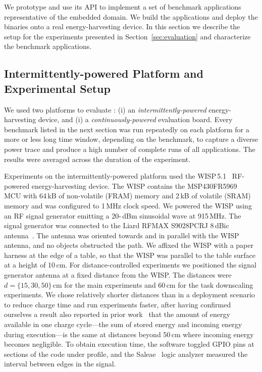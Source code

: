 We prototype \sys and use its API to implement a set of benchmark
applications representative of the embedded domain. We build the applications
and deploy the binaries onto a real energy-harvesting device. In this section
we describe the setup for the experiments presented in
Section~\ref{sec:evaluation} and characterize the benchmark applications.

\subsection{Intermittently-powered Platform and Experimental Setup}
\label{sec:results_hardware_software}

We used two platforms to evaluate \sys: (i) an \emph{intermittently-powered}
energy-harvesting device, and (i) a \emph{continuously-powered} evaluation
board.
%
Every benchmark listed in the next section was run repeatedly on
each platform for a more or less long time window, depending on the benchmark,
to capture a diverse power trace and produce a high number of complete runs of all applications.
The results were averaged across the duration of the experiment.

Experiments on the intermittently-powered platform used the
WISP\,5.1~\cite{wisp5,wisp} RF-powered energy-harvesting device.
%
The WISP contains the MSP430FR5969~\cite{wolverine} MCU with 64\,kB of
non-volatile (FRAM) memory and 2\,kB of volatile (SRAM) memory and was
configured to 1\,MHz clock speed.
%
We powered the WISP using an RF signal generator emitting  a 20-\,dBm sinusoidal wave at 915\,MHz.
The signal generator was connected to the Liard RFMAX S9028PCRJ 8\,dBic
antenna~\cite{atlas2015}.
%
The antenna was oriented towards and in parallel with the WISP antenna, and
no objects obstructed the path.
%
We affixed the WISP with a paper harness at the edge of a table, so that the
WISP was parallel to the table surface at a height of 10\,cm.
%
For distance-controlled experiments we positioned the signal generator
antenna at a fixed distance from the WISP. The distances were $d=\{15, 30,
50\}$\,cm for the main experiments and 60\,cm for the task downscaling
experiments.
%
We chose relatively shorter distances than in a deployment scenario to reduce
charge time and run experiments faster, after having confirmed ourselves a
result also reported in prior work~\cite{alpaca} that the amount of energy
available in one charge cycle---the sum of stored energy and incoming energy
during execution---is the same at distances beyond 50\,cm where incoming energy
becomes negligible.
%
To obtain execution time, the software toggled GPIO pins at sections of the code
under profile, and the Saleae~\cite{saleae} logic analyzer measured
the interval between edges in the signal.

